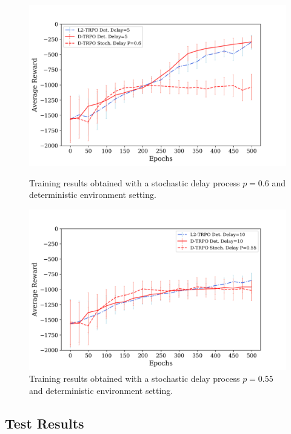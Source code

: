             \begin{figure}[hbtp]
                \centering
                \includegraphics[width=15cm, keepaspectratio]{images/results/delayp06_comparisons_1.png}
                \caption{Training results obtained with a stochastic delay process $p=0.6$ and deterministic environment setting.}
                \label{fig:results_delayp06_1}
                
                \vspace{1.5cm}
                
                \includegraphics[width=15cm, keepaspectratio]{images/results/delayp05_comparisons_1.png}
                \caption{Training results obtained with a stochastic delay process $p=0.55$ and deterministic environment setting.}
                \label{fig:results_delayp05_1}
            \end{figure}
        
        \newpage
        \subsection{Test Results}
        \label{sub:res_test_delays}
            
